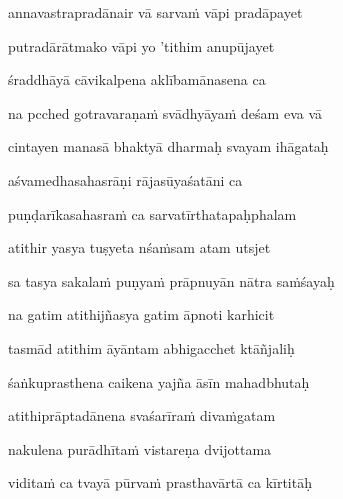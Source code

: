 annavastrapradānair vā sarva\.m vāpi pradāpayet\thinspace{\dandab} \dontdisplaylinenum

putradārātmako vāpi yo 'tithim anupūjayet \veg\dontdisplaylinenum

śraddhāyā cāvikalpena aklībamānasena ca\thinspace{\dandab} \dontdisplaylinenum

na pcched gotravaraṇa\.m svādhyāya\.m deśam eva vā \veg\dontdisplaylinenum

cintayen manasā bhaktyā dharmaḥ svayam ihāgataḥ\thinspace{\dandab} \dontdisplaylinenum

aśvamedhasahasrāṇi rājasūyaśatāni ca \veg\dontdisplaylinenum

puṇḍarīkasahasra\.m ca sarvatīrthatapaḥphalam\thinspace{\dandab} \dontdisplaylinenum

atithir yasya tuṣyeta nśa\.msam atam utsjet \veg\dontdisplaylinenum

sa tasya sakala\.m puṇya\.m prāpnuyān nātra sa\.mśayaḥ\thinspace{\dandab} \dontdisplaylinenum

na gatim atithijñasya gatim āpnoti karhicit \veg\dontdisplaylinenum

tasmād atithim āyāntam abhigacchet ktāñjaliḥ\thinspace{\dandab} \dontdisplaylinenum

śaṅkuprasthena caikena yajña āsīn mahadbhutaḥ \veg\dontdisplaylinenum

atithiprāptadānena svaśarīra\.m diva\.mgatam\thinspace{\dandab} \dontdisplaylinenum

nakulena purādhīta\.m vistareṇa dvijottama \veg\dontdisplaylinenum

vidita\.m ca tvayā pūrva\.m prasthavārtā ca kīrtitāḥ\thinspace{\dandab} \dontdisplaylinenum


